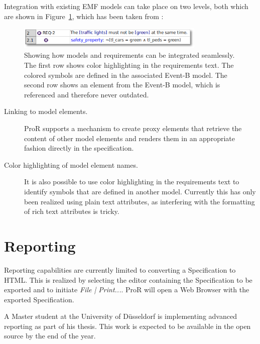 \documentclass{template/openetcs_report}
\begin{document}
Integration with existing EMF models can take place on two levels, both which are shown in Figure~\ref{fig:proxy-1}, which has been taken from \cite{integrate-models}:

\begin{figure}
	\begin{center}
	\includegraphics[width=0.8\textwidth]{img/proxy-1.png}
	\end{center}
	\caption[Seamless integration of models and requirements]{Showing how models and requirements can be integrated seamlessly. The first row shows color highlighting in the requirements text.  The colored symbols are defined in the associated Event-B model.  The second row shows an element from the Event-B model, which is referenced and therefore never outdated.}
	\label{fig:proxy-1}
\end{figure} 

\begin{description}
\item[Linking to model elements.]  ProR supports a mechanism to create proxy elements that retrieve the content of other model elements and renders them in an appropriate fashion directly in the specification.
\item[Color highlighting of model element names.] It is also possible to use color highlighting in the requirements text to identify symbols that are defined in another model.  Currently this has only been realized using plain text attributes, as interfering with the formatting of rich text attributes is tricky.
\end{description}

\section{Reporting}

Reporting capabilities are currently limited to converting a Specification to HTML.  This is realized by selecting the editor containing the Specification to be exported and to initiate \emph{File | Print...}.  ProR will open a Web Browser with the exported Specification.

A Master student at the University of Düsseldorf is implementing advanced reporting as part of his thesis.  This work is expected to be available in the open source by the end of the year.
\end{document}
